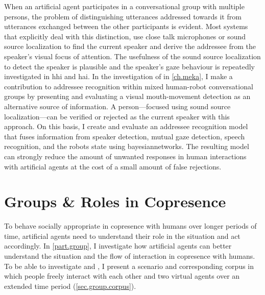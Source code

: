 When an \gls{artificial agent} participates in a \gls{conversational group} with multiple persons, the problem of distinguishing utterances addressed towards it from utterances exchanged between the other participants is evident.
Most systems that explicitly deal with this distinction, use close talk microphones or sound source localization to find the current \gls{speaker} and derive the \gls{addressee} from the \gls{speaker}'s visual focus of attention.
The usefulness of the sound source localization to detect the \gls{speaker} is plausible and the \gls{speaker}'s gaze behaviour is repeatedly investigated in \gls{hhi} and \gls{hai}.
In the investigation of  in \cref{ch.meka}, I make a contribution to \gls{addressee} recognition within mixed human-\gls{robot} \glspl{conversational group} by presenting and evaluating a visual mouth-movement detection as an alternative source of information.
A person---focused using sound source localization---can be verified or rejected as the current \gls{speaker} with this approach.
On this basis, I create and evaluate an \gls{addressee} recognition model that fuses information from \gls{speaker} detection, mutual gaze detection, speech recognition, and the \glspl{robot} state using \glspl{bayesiannetwork}.
The resulting model can strongly reduce the amount of unwanted responses in human interactions with \glspl{artificial agent} at the cost of a small amount of false rejections.

\section{Groups \& Roles in Copresence}
To behave socially appropriate in \gls{copresence} with humans over longer periods of time, \glspl{artificial agent} need to understand their role in the situation and act accordingly.
In \cref{part.group}, I investigate how \glspl{artificial agent} can better understand the situation and the flow of interaction in \gls{copresence} with humans.
To be able to investigate  and , I present a scenario and corresponding corpus in which people freely interact with each other and two \glspl{virtual agent} over an extended time period (\cref{sec.group.corpus}).

